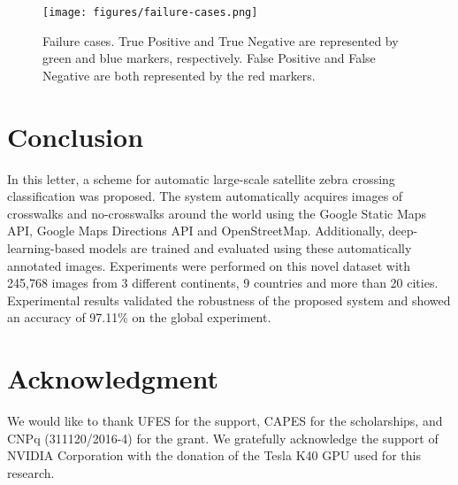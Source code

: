 \documentclass[journal]{IEEEtran}
\newcommand{\GoogleStaticMapsAPI}{Google Static Maps API\xspace}
\newcommand{\GoogleDirectionsAPI}{Google Maps Directions API\xspace}
\newcommand{\OpenStreetMap}{OpenStreetMap\xspace}
\begin{document}
\begin{figure}[t]
	\centering
	\texttt{[image: figures/failure-cases.png]}
	\caption{Failure cases. True Positive and True Negative are represented by green and blue markers, respectively. False Positive and False Negative are both represented by the red markers.}
	\label{fig:errors}
\end{figure}


\section{Conclusion}

In this letter, a scheme for automatic large-scale satellite zebra crossing classification was proposed. The system automatically acquires images of crosswalks and no-crosswalks around the world using the \GoogleStaticMapsAPI, \GoogleDirectionsAPI and \OpenStreetMap. Additionally, deep-learning-based models are trained and evaluated using these automatically annotated images. Experiments were performed on this novel dataset with 245,768 images from 3 different continents, 9 countries and more than 20 cities. Experimental results validated the robustness of the proposed system and showed an accuracy of 97.11\% on the global experiment.


\section*{Acknowledgment}

We would like to thank UFES for the support, CAPES for the scholarships, and CNPq (311120/2016-4) for the grant. We gratefully acknowledge the support of NVIDIA Corporation with the donation of the Tesla K40 GPU used for this research.



\end{document}
